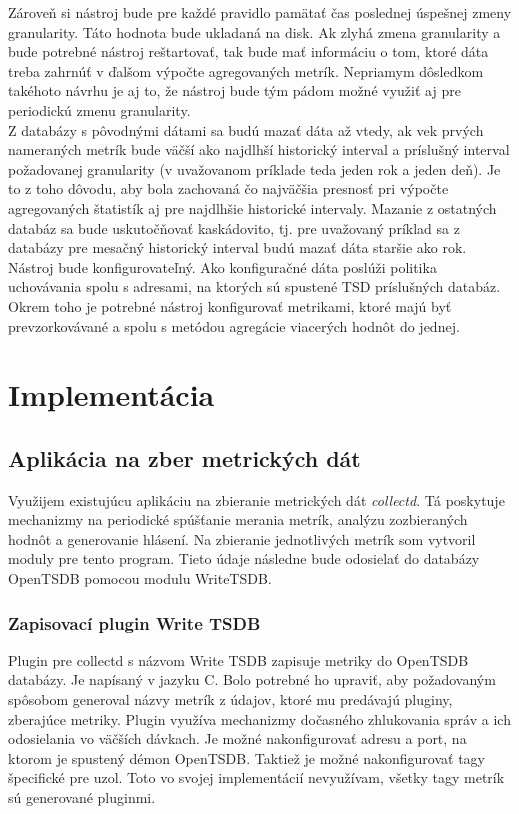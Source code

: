 \documentclass[printed,11pt,twoside,color,cover,table]{fithesis3}
\begin{document}
Zároveň si nástroj bude pre každé pravidlo pamätať čas poslednej úspešnej zmeny granularity. Táto hodnota bude ukladaná na disk. Ak zlyhá zmena granularity a bude potrebné nástroj reštartovať, 
tak bude mať informáciu o tom, ktoré dáta treba zahrnúť v ďalšom výpočte agregovaných metrík. Nepriamym dôsledkom takéhoto návrhu je aj to, že nástroj bude tým pádom možné využiť aj pre periodickú
zmenu granularity.
\\Z databázy s pôvodnými dátami sa budú mazať dáta až vtedy, ak vek prvých nameraných metrík bude väčší ako najdlhší historický interval a príslušný interval požadovanej granularity (v uvažovanom príklade 
teda jeden rok a jeden deň). Je to z toho dôvodu, aby bola zachovaná čo najväčšia presnosť pri výpočte agregovaných štatistík aj pre najdlhšie historické intervaly. Mazanie z ostatných databáz sa bude 
uskutočňovať kaskádovito, tj. pre uvažovaný príklad sa z databázy pre mesačný historický interval budú mazať dáta staršie ako rok.
\\Nástroj bude konfigurovateľný. Ako konfiguračné dáta poslúži politika uchovávania spolu s adresami, na ktorých sú spustené TSD príslušných databáz. Okrem toho je potrebné nástroj konfigurovať
metrikami, ktoré majú byť prevzorkovávané a spolu s metódou agregácie viacerých hodnôt do jednej.

\chapter{Implementácia}
\section{Aplikácia na zber metrických dát}
Využijem existujúcu aplikáciu na zbieranie metrických dát \emph{collectd}. Tá poskytuje mechanizmy na periodické spúšťanie merania metrík,
analýzu zozbieraných hodnôt a generovanie hlásení. Na zbieranie jednotlivých metrík som vytvoril moduly pre tento program. Tieto údaje následne bude odosielať do databázy OpenTSDB
pomocou modulu WriteTSDB.

\subsection{Zapisovací plugin Write TSDB}
Plugin pre collectd s názvom Write TSDB zapisuje metriky do OpenTSDB databázy.\cite{writetsdb} 
Je napísaný v jazyku C. Bolo potrebné ho upraviť, aby požadovaným spôsobom generoval názvy metrík z údajov, ktoré mu predávajú pluginy, zberajúce metriky. Plugin využíva mechanizmy
dočasného zhlukovania správ a ich odosielania vo väčších dávkach. Je možné nakonfigurovať adresu a port, na ktorom je spustený
démon OpenTSDB. Taktiež je možné nakonfigurovať tagy špecifické pre uzol. Toto vo svojej implementácií nevyužívam, všetky tagy metrík sú generované pluginmi.
\end{document}
